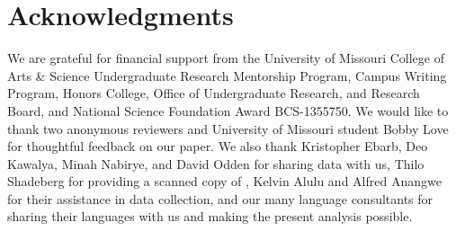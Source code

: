 \documentclass[output=paper]{langscibook}
\begin{document}
\section*{Acknowledgments}

We are grateful for financial support from the University of Missouri College of Arts \& Science Undergraduate Research Mentorship Program, Campus Writing Program, Honors College, Office of Undergraduate Research, and Research Board, and National Science Foundation Award BCS-1355750. We would like to thank two anonymous reviewers and University of Missouri student Bobby Love for thoughtful feedback on our paper. We also thank Kristopher Ebarb, Deo Kawalya, Minah Nabirye, and David Odden for sharing data with us, Thilo Shadeberg for providing a scanned copy of \citet{williams_lexico-statistical_1973}, Kelvin Alulu and Alfred Anangwe for their assistance in data collection, and our many language consultants for sharing their languages with us and making the present analysis possible.

{\sloppy\printbibliography[heading=subbibliography,notkeyword=this]}
\end{document}
